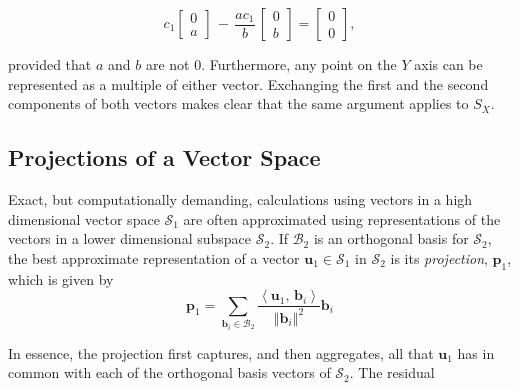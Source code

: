 \documentclass[graybox,envcountchap,sectrefs]{svmono}\usepackage[]{graphicx}\usepackage[]{xcolor}
\begin{document}
\begin{appendices}
\begin{equation}
c_{1}\left[\begin{array}{c}
0\\
a
\end{array}\right]\,-\,\frac{ac_{1}}{b}\,\left[\begin{array}{c}
0\\
b
\end{array}\right]=\left[\begin{array}{c}
0\\
0
\end{array}\right],\label{eq:1DVectorSpace}
\end{equation}

provided that $a$ and $b$ are not 0. Furthermore, any point on the
$Y$ axis can be represented as a multiple of either vector. Exchanging
the first and the second components of both vectors makes clear that
the same argument applies to ${S}_{X}$.

\subsection{Projections of a Vector Space}

Exact, but computationally demanding, calculations using vectors in
a high dimensional vector space $\mathcal{{S}}_{1}$ are often approximated
using representations of the vectors in a lower dimensional subspace
$\mathcal{{S}}_{2}$. If $\mathcal{{B}}_{2}$ is an orthogonal basis
for $\mathcal{{S}}_{2}$, the best approximate representation of a
vector $\mathrm{\mathbf{u}_{1}}\in\mathcal{{S}}_{1}$ in $\mathcal{{S}}_{2}$
is its \emph{projection}, $\mathrm{\mathbf{p}}_{1}$, which is given
by
\begin{equation}
\mathrm{\mathbf{p}}_{1}=\sum_{\mathrm{\mathbf{b}}_{i}\in\mathcal{{B}}_{2}}\dfrac{\left\langle \mathrm{\mathbf{u}}_{1},\,\mathrm{\mathbf{b}}_{i}\right\rangle }{\left\Vert \mathrm{\mathbf{b}}_{i}\right\Vert ^{2}}\mathrm{\mathbf{b}}_{i}\label{eq:Projection}
\end{equation}

In essence, the projection first captures, and then aggregates, all
that $\mathrm{\mathbf{u}}_{1}$ has in common with each of the orthogonal
basis vectors of $\mathcal{{S}}_{2}$. The residual 


\end{appendices}
\end{document}
